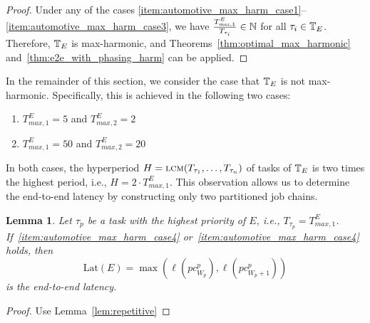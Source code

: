 \documentclass[10pt,conference]{resources/IEEEtran}
\newtheorem{lemma}[theorem]{Lemma}
\theoremstyle{definition}
\newcommand{\lat}{\mathrm{Lat}}
\newcommand{\pc}{{pc}}
\newcommand{\Tmaxone}{T^E_{\mathit{max},1}}
\newcommand{\Tmaxtwo}{T^E_{\mathit{max},2}}
\begin{document}
	\begin{proof}
		Under any of the cases \ref{item:automotive_max_harm_case1}--\ref{item:automotive_max_harm_case3}, we have
		$\frac{\Tmaxone}{T_{\tau_i}} \in \Nbb$ for all $\tau_i \in \mathbb{T}_E$.
		Therefore, $\mathbb{T}_E$ is max-harmonic, and Theorems~\ref{thm:optimal_max_harmonic} and~\ref{thm:e2e_with_phasing_harm} can be applied.
	\end{proof}

	In the remainder of this section, we consider the case that $\mathbb{T}_E$ is not max-harmonic. 
	Specifically, this is achieved in the following two cases:
	\begin{enumerate}[label=(\roman*),start=4]
		\item $\Tmaxone = 5$ and $\Tmaxtwo=2$ \label{item:automotive_max_harm_case4}
		\item $\Tmaxone = 50$ and $\Tmaxtwo=20$ \label{item:automotive_max_harm_case5}
	\end{enumerate}
	In both cases, the hyperperiod $H = \operatorname*{\textsc{lcm}}(T_{\tau_1}, \dots, T_{\tau_n})$ of tasks of $\mathbb{T}_E$ is two times the highest period, i.e., $H = 2\cdot \Tmaxone$.
	This observation allows us to determine the end-to-end latency by constructing only two partitioned job chains.

	\begin{lemma}
		Let $\tau_p$ be a task with the highest priority of $E$, i.e., $T_{\tau_p} = \Tmaxone$.
		If~\ref{item:automotive_max_harm_case4} or~\ref{item:automotive_max_harm_case4} holds, then 
		\begin{equation}
			\lat(E) = \max( \ell(\pc^p_{W_p}) , \ell(\pc^p_{W_p+1}) )
		\end{equation}
		is the end-to-end latency.
	\end{lemma}

	\begin{proof}
		Use Lemma~\ref{lem:repetitive}
	\end{proof}
\end{document}
